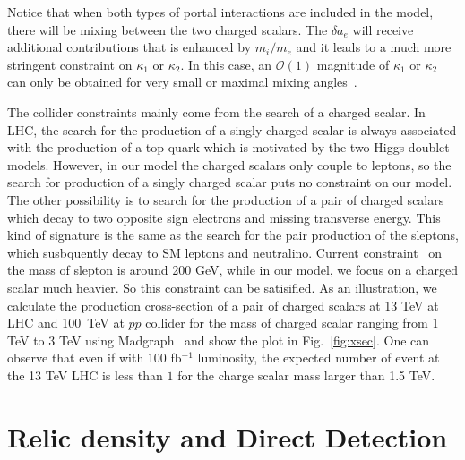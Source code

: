 \documentclass[aps,prd,letterpaper,showpacs,twocolumn,preprintnumbers,floatfix,superscriptaddress]{revtex4-1}
\begin{document}
Notice that when both types of portal interactions are included in the model, there 
will be mixing between the two charged scalars.
%
 The $\delta a_e$ will receive additional contributions that is enhanced by 
${m_i}/{m_e}$ and it leads to a much more stringent constraint on $\kappa_1$ or $\kappa_2$. 
%
In this case, an $\mathcal{O}(1)$ magnitude of $\kappa_1$ or $\kappa_2$ can only be obtained for 
very small or maximal mixing angles~\cite{Chao:2016lqd}.


The collider constraints mainly come from the search of a charged scalar. 
%
In LHC, the search for the production of a singly charged scalar is always associated with the production of a top quark which is motivated by the two Higgs doublet models.
%
 However, in our model the charged scalars only couple to leptons, so the search for production of a singly charged scalar puts no constraint on our model. 
 The other possibility is to search for the production of a pair of charged scalars which decay to 
 two opposite sign electrons and missing transverse energy. 
 This kind of signature is the same as the search for the pair production of the sleptons, which susbquently decay to SM leptons and neutralino. 
Current constraint~\cite{Khachatryan:2014qwa,Aad:2014vma} on the mass of slepton is around 200 GeV, while in our model, we focus on a charged scalar much heavier. So this constraint can be satisified. 
 As an illustration, we calculate the production cross-section of a pair of charged scalars at 13 TeV at LHC 
 and 100~TeV at $pp$ collider for the mass of charged scalar ranging from 1 TeV to 3 TeV using Madgraph~\cite{Alwall:2014hca} and show the plot in Fig.~\ref{fig:xsec}. 
% 
One can observe that even if with 100 fb$^{-1}$ luminosity, the expected number of event at the 13 TeV LHC is less than $1$ for the charge scalar mass larger than 1.5 TeV.  





\section{Relic density and Direct Detection}
\end{document}
